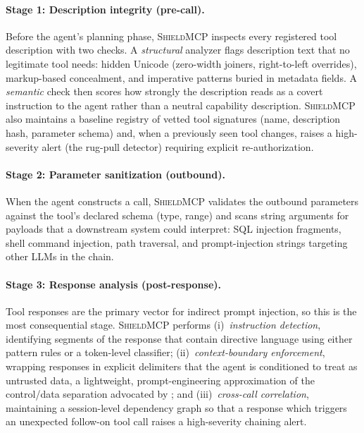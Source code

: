 \documentclass[11pt]{article}
\newcommand{\shield}{\textsc{ShieldMCP}}
\begin{document}
\paragraph{Stage 1: Description integrity (pre-call).}
Before the agent's planning phase, \shield{} inspects every registered tool
description with two checks. A \emph{structural} analyzer flags description text
that no legitimate tool needs: hidden Unicode (zero-width joiners, right-to-left
overrides), markup-based concealment, and imperative patterns buried in metadata
fields. A \emph{semantic} check then scores how strongly the description reads as a
covert instruction to the agent rather than a neutral capability description.
\shield{} also maintains a baseline registry of vetted tool signatures (name,
description hash, parameter schema) and, when a previously seen tool changes, raises
a high-severity alert (the rug-pull detector) requiring explicit re-authorization.

\paragraph{Stage 2: Parameter sanitization (outbound).}
When the agent constructs a call, \shield{} validates the outbound parameters
against the tool's declared schema (type, range) and scans string arguments for
payloads that a downstream system could interpret: SQL injection fragments, shell
command injection, path traversal, and prompt-injection strings targeting other
LLMs in the chain.

\paragraph{Stage 3: Response analysis (post-response).}
Tool responses are the primary vector for indirect prompt injection, so this is the
most consequential stage. \shield{} performs (i)~\emph{instruction detection},
identifying segments of the response that contain directive language using either
pattern rules or a token-level classifier; (ii)~\emph{context-boundary
enforcement}, wrapping responses in explicit delimiters that the agent is
conditioned to treat as untrusted data, a lightweight, prompt-engineering
approximation of the control/data separation advocated by
\citet{debenedetti2025camel}; and (iii)~\emph{cross-call correlation}, maintaining a
session-level dependency graph so that a response which triggers an unexpected
follow-on tool call raises a high-severity chaining alert.
\end{document}
